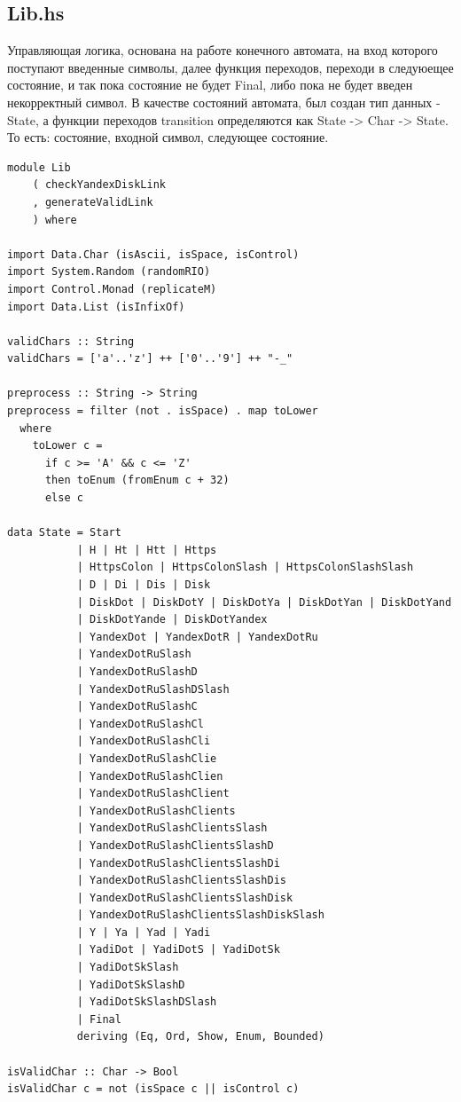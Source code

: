 \documentclass[areasetadvanced]{scrartcl}
\begin{document}
\subsection{Lib.hs}
Управляющая логика, основана на работе конечного автомата, на вход которого поступают введенные символы, далее функция переходов, переходи в следуюещее состояние, и так пока состояние не будет Final, либо пока не будет введен некорректный символ.
В качестве состояний автомата, был создан тип данных - State, а функции переходов transition определяются как State -> Char -> State. То есть: состояние, входной символ, следующее состояние. 
\begin{lstlisting}[caption={Lib.hs}, label={lst:example}]
	module Lib
    ( checkYandexDiskLink
    , generateValidLink
    ) where

import Data.Char (isAscii, isSpace, isControl)
import System.Random (randomRIO)
import Control.Monad (replicateM)
import Data.List (isInfixOf)

validChars :: String
validChars = ['a'..'z'] ++ ['0'..'9'] ++ "-_"

preprocess :: String -> String
preprocess = filter (not . isSpace) . map toLower
  where
    toLower c =
      if c >= 'A' && c <= 'Z'
      then toEnum (fromEnum c + 32)
      else c
      
data State = Start 
           | H | Ht | Htt | Https 
           | HttpsColon | HttpsColonSlash | HttpsColonSlashSlash
           | D | Di | Dis | Disk 
           | DiskDot | DiskDotY | DiskDotYa | DiskDotYan | DiskDotYand
           | DiskDotYande | DiskDotYandex 
           | YandexDot | YandexDotR | YandexDotRu 
           | YandexDotRuSlash
           | YandexDotRuSlashD 
           | YandexDotRuSlashDSlash
           | YandexDotRuSlashC
           | YandexDotRuSlashCl
           | YandexDotRuSlashCli
           | YandexDotRuSlashClie
           | YandexDotRuSlashClien
           | YandexDotRuSlashClient
           | YandexDotRuSlashClients
           | YandexDotRuSlashClientsSlash
           | YandexDotRuSlashClientsSlashD
           | YandexDotRuSlashClientsSlashDi
           | YandexDotRuSlashClientsSlashDis
           | YandexDotRuSlashClientsSlashDisk
           | YandexDotRuSlashClientsSlashDiskSlash
           | Y | Ya | Yad | Yadi
           | YadiDot | YadiDotS | YadiDotSk
           | YadiDotSkSlash
           | YadiDotSkSlashD
           | YadiDotSkSlashDSlash
           | Final
           deriving (Eq, Ord, Show, Enum, Bounded)

isValidChar :: Char -> Bool
isValidChar c = not (isSpace c || isControl c)


\end{lstlisting}
\end{document}
